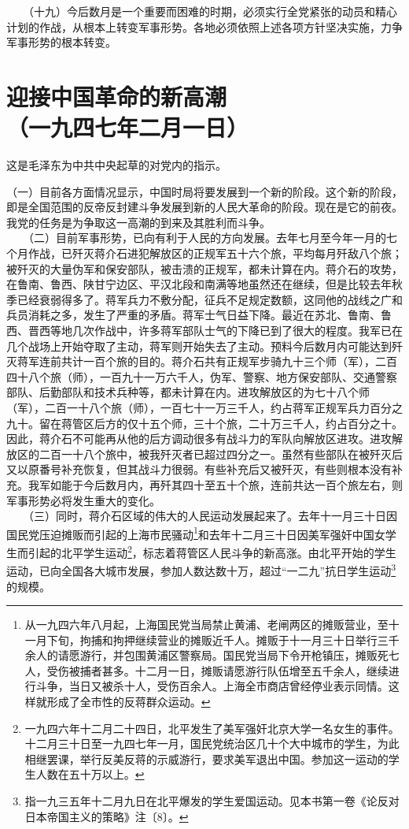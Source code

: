 \documentclass[cn,11pt,chinese]{elegantbook}
\def\myformat#1{\hfil\hfil #1}
\begin{document}
　　（十九）今后数月是一个重要而困难的时期，必须实行全党紧张的动员和精心计划的作战，从根本上转变军事形势。各地必须依照上述各项方针坚决实施，力争军事形势的根本转变。\\
\newpage\section*{\myformat{迎接中国革命的新高潮}\\\myformat{（一九四七年二月一日）}}
\begin{introduction}\item  这是毛泽东为中共中央起草的对党内的指示。\end{introduction}
（一）目前各方面情况显示，中国时局将要发展到一个新的阶段。这个新的阶段，即是全国范围的反帝反封建斗争发展到新的人民大革命的阶段。现在是它的前夜。我党的任务是为争取这一高潮的到来及其胜利而斗争。\\
　　（二）目前军事形势，已向有利于人民的方向发展。去年七月至今年一月的七个月作战，已歼灭蒋介石进犯解放区的正规军五十六个旅，平均每月歼敌八个旅；被歼灭的大量伪军和保安部队，被击溃的正规军，都未计算在内。蒋介石的攻势，在鲁南、鲁西、陕甘宁边区、平汉北段和南满等地虽然还在继续，但是比较去年秋季已经衰弱得多了。蒋军兵力不敷分配，征兵不足规定数额，这同他的战线之广和兵员消耗之多，发生了严重的矛盾。蒋军士气日益下降。最近在苏北、鲁南、鲁西、晋西等地几次作战中，许多蒋军部队士气的下降已到了很大的程度。我军已在几个战场上开始夺取了主动，蒋军则开始失去了主动。预料今后数月内可能达到歼灭蒋军连前共计一百个旅的目的。蒋介石共有正规军步骑九十三个师（军），二百四十八个旅（师），一百九十一万六千人，伪军、警察、地方保安部队、交通警察部队、后勤部队和技术兵种等，都未计算在内。进攻解放区的为七十八个师（军），二百一十八个旅（师），一百七十一万三千人，约占蒋军正规军兵力百分之九十。留在蒋管区后方的仅十五个师，三十个旅，二十万三千人，约占百分之十。因此，蒋介石不可能再从他的后方调动很多有战斗力的军队向解放区进攻。进攻解放区的二百一十八个旅中，被我歼灭者已超过四分之一。虽然有些部队在被歼灭后又以原番号补充恢复，但其战斗力很弱。有些补充后又被歼灭，有些则根本没有补充。我军如能于今后数月内，再歼其四十至五十个旅，连前共达一百个旅左右，则军事形势必将发生重大的变化。\\
　　（三）同时，蒋介石区域的伟大的人民运动发展起来了。去年十一月三十日因国民党压迫摊贩而引起的上海市民骚动\footnote[1]{ 从一九四六年八月起，上海国民党当局禁止黄浦、老闸两区的摊贩营业，至十一月下旬，拘捕和拘押继续营业的摊贩近千人。摊贩于十一月三十日举行三千余人的请愿游行，并包围黄浦区警察局。国民党当局下令开枪镇压，摊贩死七人，受伤被捕者甚多。十二月一日，摊贩请愿游行队伍增至五千余人，继续进行斗争，当日又被杀十人，受伤百余人。上海全市商店曾经停业表示同情。这样就形成了全市性的反蒋群众运动。}和去年十二月三十日因美军强奸中国女学生而引起的北平学生运动\footnote[2]{ 一九四六年十二月二十四日，北平发生了美军强奸北京大学一名女生的事件。十二月三十日至一九四七年一月，国民党统治区几十个大中城市的学生，为此相继罢课，举行反美反蒋的示威游行，要求美军退出中国。参加这一运动的学生人数在五十万以上。}，标志着蒋管区人民斗争的新高涨。由北平开始的学生运动，已向全国各大城市发展，参加人数达数十万，超过“一二九”抗日学生运动\footnote[3]{ 指一九三五年十二月九日在北平爆发的学生爱国运动。见本书第一卷《论反对日本帝国主义的策略》注〔8〕。}的规模。\\
\end{document}
